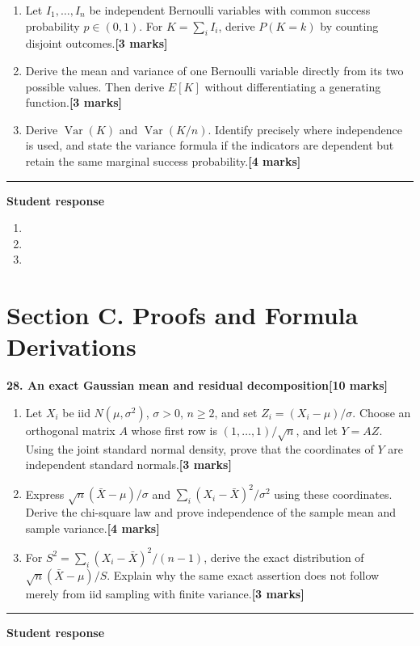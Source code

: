 \documentclass[11pt,a4paper]{article}
\newlength{\BlankAnswerHeight}\setlength{\BlankAnswerHeight}{16mm}
\newcommand{\AnswerBlank}{\leavevmode\par\vspace{\BlankAnswerHeight}}
\begin{document}
\begin{enumerate}[label=(\alph*),leftmargin=8mm,itemsep=3pt]
\item Let \(I_1,\ldots,I_n\) be independent Bernoulli variables with common success probability \(p\in(0,1)\). For \(K=\sum_i I_i\), derive \(P(K=k)\) by counting disjoint outcomes.\hfill\textbf{[3 marks]}
\item Derive the mean and variance of one Bernoulli variable directly from its two possible values. Then derive \(E[K]\) without differentiating a generating function.\hfill\textbf{[3 marks]}
\item Derive \(\operatorname{Var}(K)\) and \(\operatorname{Var}(K/n)\). Identify precisely where independence is used, and state the variance formula if the indicators are dependent but retain the same marginal success probability.\hfill\textbf{[4 marks]}
\end{enumerate}\par\medskip\hrule\medskip\textbf{Student response}\par
\begin{enumerate}[label=(\alph*),leftmargin=8mm,itemsep=3pt]
\item
\AnswerBlank
\item
\AnswerBlank
\item
\AnswerBlank
\end{enumerate}
\newpage\section*{Section C. Proofs and Formula Derivations}
\textbf{28. An exact Gaussian mean and residual decomposition}\hfill\textbf{[10 marks]}\par\medskip
\begin{enumerate}[label=(\alph*),leftmargin=8mm,itemsep=3pt]
\item Let \(X_i\) be iid \(N(\mu,\sigma^2)\), \(\sigma>0\), \(n\ge2\), and set \(Z_i=(X_i-\mu)/\sigma\). Choose an orthogonal matrix \(A\) whose first row is \((1,\ldots,1)/\sqrt n\), and let \(Y=AZ\). Using the joint standard normal density, prove that the coordinates of \(Y\) are independent standard normals.\hfill\textbf{[3 marks]}
\item Express \(\sqrt n(\bar X-\mu)/\sigma\) and \(\sum_i(X_i-\bar X)^2/\sigma^2\) using these coordinates. Derive the chi-square law and prove independence of the sample mean and sample variance.\hfill\textbf{[4 marks]}
\item For \(S^2=\sum_i(X_i-\bar X)^2/(n-1)\), derive the exact distribution of \(\sqrt n(\bar X-\mu)/S\). Explain why the same exact assertion does not follow merely from iid sampling with finite variance.\hfill\textbf{[3 marks]}
\end{enumerate}\par\medskip\hrule\medskip\textbf{Student response}\par
\end{document}
